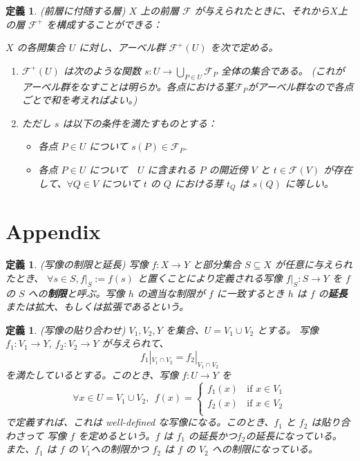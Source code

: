 \documentclass[uplatex, 12pt, dvipdfmx]{jsreport}
\newtheorem{dfn}[thm]{定義}
\newcommand{\mcF}{\mathcal{F}}
\begin{document}
\begin{dfn}{(前層に付随する層)}
    $X$ 上の前層 $\mcF$ が与えられたときに、それから$X$上の層 $\mcF^+$ を構成することができる：

    $X$ の各開集合 $U$ に対し、アーベル群 $\mcF^+(U)$ を次で定める。

    \begin{enumerate}
        \item $\mcF^+(U)$ は次のような関数 $s: U \to \bigcup_{P \in U} \mcF_P$ 全体の集合である。
        (これがアーベル群をなすことは明らか。各点における茎$\mcF_P$がアーベル群なので各点ごとで和を考えればよい。)
        \item ただし $s$ は以下の条件を満たすものとする：
              \begin{itemize}
                  \item 各点 $P \in U$ について $s(P) \in \mcF_P$.
                  \item 各点 $P \in U$ について　$U$ に含まれる $P$ の開近傍 $V$ と
                        $t \in \mcF(V)$ が存在して、$\forall Q \in V$ について
                        $t$ の $Q$ における芽 $t_Q$ は $s(Q)$ に等しい。
              \end{itemize}

    \end{enumerate}

\end{dfn}


\chapter*{Appendix}

\begin{dfn}{(写像の制限と延長)}
    写像 $f:X \to Y$ と部分集合 $S \subseteq X$ が任意に与えられたとき、
    $\forall s \in S, f|_S := f(s)$ と置くことにより定義される写像 $f|_S: S \to Y$ を
    $f$ の $S$ への\textbf{制限}と呼ぶ。写像 $h$ の適当な制限が $f$ に一致するとき $h$ は
     $f$ の\textbf{延長}または拡大、もしくは拡張であるという。
\end{dfn}

\begin{dfn}{(写像の貼り合わせ)}
    $V_1, V_2, Y$ を集合、$U = V_1 \cup V_2$ とする。
    写像 $f_1 : V_1 \to Y$, $f_2 : V_2 \to Y$ が与えられて、
    \[
        f_1|_{V_1 \cap V_2} = f_2|_{V_1 \cap V_2}
    \]
    を満たしているとする。このとき、写像 $f: U \to Y$ を
    \[
        \forall x \in U = V_1 \cup V_2, \ \ f(x) =
        \begin{cases}
            f_1(x) \ \ \ \ \text{if } x \in V_1 \\
            f_2(x) \ \ \ \ \text{if } x \in V_2 \\
        \end{cases}
    \]
    で定義すれば、これは well-defined な写像になる。このとき、$f_1$ と $f_2$ は貼り合わさって
    写像 $f$ を定めるという。$f$ は $f_1$ の延長かつ$f_2$の延長になっている。
    また、$f_1$ は $f$ の $V_1$への制限かつ $f_2$ は $f$ の $V_2$ への制限になっている。
    \end{dfn}
\end{document}

